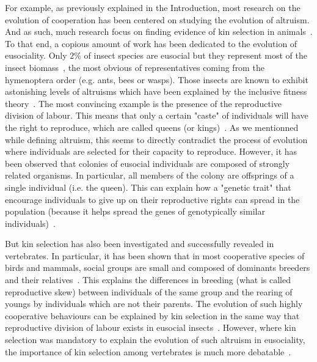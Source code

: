     For example, as previously explained in the Introduction, most research on the evolution of cooperation has been centered on studying the evolution of altruism. And as such, much research focus on finding evidence of kin selection in animals~\parencite{Bourke2014}. To that end, a copious amount of work has been dedicated to the evolution of eusociality. Only $2\%$ of insect species are eusocial but they represent most of the insect biomass~\parencite{Wilson2008}, the most obvious of representatives coming from the hymenoptera order (e.g. ants, bees or wasps). Those insects are known to exhibit astonishing levels of altruisms which have been explained by the inclusive fitness theory~\parencite{Bourke2011, Wilson2008}. The most convincing example is the presence of the reproductive division of labour. This means that only a certain "caste" of individuals will have the right to reproduce, which are called queens (or kings)~\parencite{Wilson1990}. As we mentionned while defining altruism, this seems to directly contradict the process of evolution where individuals are selected for their capacity to reproduce. However, it has been observed that colonies of eusocial individuals are composed of strongly related organisms. In particular, all members of the colony are offsprings of a single individual (i.e. the queen). This can explain how a "genetic trait" that encourage individuals to give up on their reproductive rights can spread in the population (because it helps spread the genes of genotypically similar individuals)~\parencite{Queller1998}.


    But kin selection has also been investigated and successfully revealed in vertebrates. In particular, it has been shown that in most cooperative species of birds and mammals, social groups are small and composed of dominants breeders and their relatives~\parencite{Dugatkin1997, Clutton-Brock2002}. This explains the differences in breeding (what is called reproductive skew) between individuals of the same group and the rearing of youngs by individuals which are not their parents. The evolution of such highly cooperative behaviours can be explained by kin selection in the same way that reproductive division of labour exists in eusocial insects~\parencite{Bourke2011}. However, where kin selection was mandatory to explain the evolution of such altruism in eusociality, the importance of kin selection among vertebrates is much more debatable~\parencite{Griffin2003, Clutton-Brock2002}.

